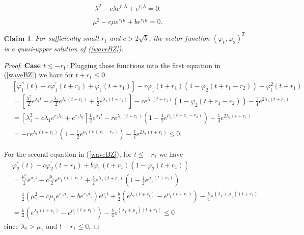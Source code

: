 \documentclass[10pt,a4paper]{amsart}
\newtheorem{claim}{Claim}
\begin{document}
\begin{equation}\label{l1}
\lambda^2-c\lambda e^{r_1\lambda}+e^{r_1\lambda }=0.
\end{equation}

\begin{equation}\label{m1}
\mu^2-c\mu e^{r_1\mu}+be^{r_1\mu }=0.
\end{equation}

\begin{claim}\label{claim 6}
For sufficiently small $r_1$ and $c>2\sqrt{b}$, the vector function $(\varphi_1 ,\varphi_2)^T$ is a quasi-upper solution of (\ref{waveBZ}).
\end{claim}

\begin{proof}
{\bf Case $t\le - r_1 $}: 
Plugging these functions into the first equation in (\ref{waveBZ}) we have
for $t+r_1 \leq0$
\begin{align*}
&  \left[
\varphi_{1}^{\prime\prime}(t)-c\varphi_{1}^{\prime}(t+r_1)+\varphi
_{1}(t+r_1)\right]  -r\varphi_{1}(t+r_1)(1-\varphi_{2}(t+r_1-r_2))-\varphi_{1}^{2}(t+r_1)\\
&  =\left[  \frac{\lambda_{1}^{2}}{2}e^{\lambda_{1}t}-c\frac{\lambda_{1}} 
{2}e^{\lambda_{1}(t+r_1)}+\frac{1}{2}e^{\lambda_{1}(t+r_1)}\right]  -re^{\lambda_{1} 
(t+r_1)}\left(  1-\varphi_{2}(t+r_1-r_2)\right)  -\frac{1}{4}e^{2\lambda_{1}(t+r_1)}\\
&  =\left[  \lambda_{1}^{2}-c\lambda_{1}e^{r_1\lambda_1}+e^{r_1\lambda_1}\right]  \frac{1}{2}e^{\lambda_{1} 
t}-re^{\lambda_{1}(t+r_1)}\left(  1-\frac{1}{2} e^{\mu_1(t+r_1-r_2)}\right)  -\frac{1} 
{4}e^{2\lambda_{1}(t+r_1)}\\
&  =-re^{\lambda_{1}(t+r_1)}\left(  1-\frac{1}{2} e^{\mu_1(t+r_1-r_2)}\right)  -\frac{1} 
{4}e^{2\lambda_{1}(t+r_1)}
\leq 0.
\end{align*}

\medskip
For the second equation in (\ref{waveBZ}), for $t\le -r_1$ we have 
\begin{align*}
&  \varphi_{2}^{\prime\prime}(t)-c\varphi_{2}^{\prime}(t+r_1)+b\varphi
_{1}(t+r_1)\left(  1-\varphi_{2}(t+r_1)\right)  \\
&
=\frac{\mu_{1}^{2}}{2}e^{\mu_{1}t}-c\frac{\mu_{1}}{2}e^{\mu_{1}(t+r_1)}+\frac
{b}{2}e^{\lambda_{1}(t+r_1)}\left(  1-\frac{1}{2}e^{\mu_{1}(t+r_1)}\right)  \\
&  =\frac{1}{2}\left( \mu^2_1-c\mu_1e^{r_1\mu_1}+be^{r_1\mu_1} \right)  e^{\mu_1t} 
+\frac{b}{2} \left(  e^{\lambda_1(t+r_1)} -e^{\mu_1(t+r_1)}     \right)
-\frac{b}{4} e^{(\lambda_1+\mu_1)(t+r_1)}\\
& = \frac{b}{2} \left(  e^{\lambda_1(t+r_1)} -e^{\mu_1(t+r_1)}     \right)
-\frac{b}{4} e^{(\lambda_1+\mu_1)(t+r_1)} \le 0
\end{align*}
since $\lambda_1 >\mu_1$ and $t+r_1 \le 0$.


\end{proof}
\end{document}
